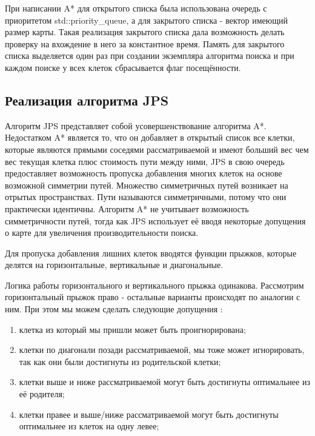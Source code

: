 

При написании A* для открытого списка была использована очередь с приоритетом std::priority\_queue, а для закрытого списка - вектор имеющий размер карты. Такая реализация закрытого списка дала возможность делать проверку на вхождение в него за константное время. Память для закрытого списка выделяется один раз при создании экземпляра алгоритма поиска и при каждом поиске у всех клеток сбрасывается флаг посещённости.

\subsection{Реализация алгоритма JPS}

Алгоритм JPS представляет собой усовершенствование алгоритма A*. Недостатком A* является то, что он добавляет в открытый список все клетки, которые являются прямыми соседями рассматриваемой и имеют больший вес чем вес текущая клетка плюс стоимость пути между ними, JPS в свою очередь предоставляет возможность пропуска добавления многих клеток на основе возможной симметрии путей. Множество симметричных путей возникает на отрытых пространствах. Пути называются симметричными, потому что они практически идентичны. Алгоритм A* не учитывает возможность симметричности путей, тогда как JPS использует её вводя некоторые допущения о карте для увеличения производительности поиска. 

Для пропуска добавления лишних клеток вводятся функции прыжков, которые делятся на горизонтальные, вертикальные и диагональные.

Логика работы горизонтального и вертикального прыжка одинакова. Рассмотрим горизонтальный прыжок право - остальные варианты происходят по аналогии с ним. При этом мы можем сделать следующие допущения \cite{JPS_DETAILS}:

\begin{enumerate}
    \item клетка из который мы пришли может быть проигнорирована;
    \item клетки по диагонали позади рассматриваемой, мы тоже может игнорировать, так как они были достигнуты из родительской клетки;
    \item клетки выше и ниже рассматриваемой могут быть достигнуты оптимальнее из её родителя;
    \item клетки правее и выше/ниже рассматриваемой могут быть достигнуты оптимальнее из клеток на одну левее;
\end{enumerate}

